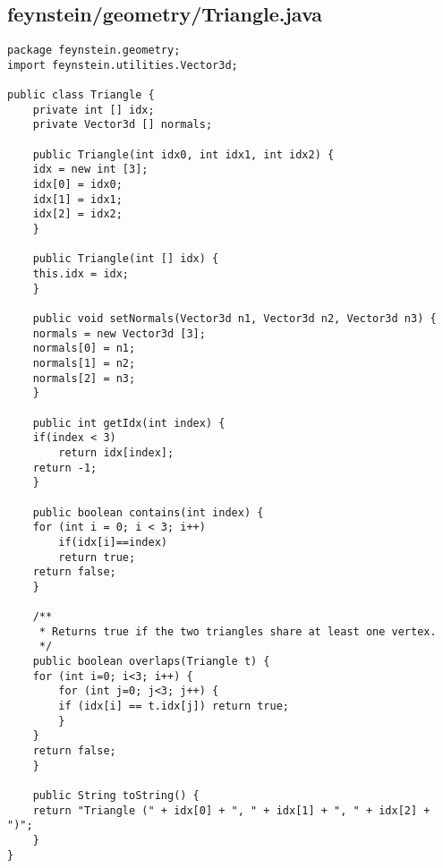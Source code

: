 \subsection*{feynstein/geometry/Triangle.java}
\begin{lstlisting}
package feynstein.geometry;
import feynstein.utilities.Vector3d;

public class Triangle {
    private int [] idx;
    private Vector3d [] normals;
	
    public Triangle(int idx0, int idx1, int idx2) {
	idx = new int [3];
	idx[0] = idx0;
	idx[1] = idx1;
	idx[2] = idx2;
    }
	
    public Triangle(int [] idx) {
	this.idx = idx;
    }
	
    public void setNormals(Vector3d n1, Vector3d n2, Vector3d n3) {
	normals = new Vector3d [3];
	normals[0] = n1;
	normals[1] = n2;
	normals[2] = n3;
    }
	
    public int getIdx(int index) {
	if(index < 3)
	    return idx[index];
	return -1;
    }

    public boolean contains(int index) {
	for (int i = 0; i < 3; i++)
	    if(idx[i]==index)
		return true;
	return false;
    }

    /**
     * Returns true if the two triangles share at least one vertex.
     */
    public boolean overlaps(Triangle t) {
	for (int i=0; i<3; i++) {
	    for (int j=0; j<3; j++) {
		if (idx[i] == t.idx[j]) return true;
	    }
	}
	return false;
    }

    public String toString() {
	return "Triangle (" + idx[0] + ", " + idx[1] + ", " + idx[2] + ")";
    }
}\end{lstlisting}

